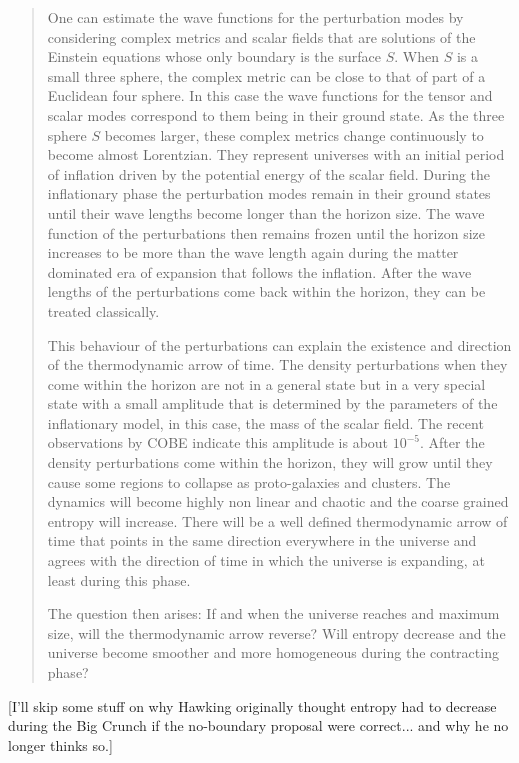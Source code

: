 \begin{quote}
One can estimate the wave functions for the perturbation modes by considering complex metrics and scalar fields that are solutions of the Einstein equations whose only boundary is the surface $S$. When $S$ is a small three sphere, the complex metric can be close to that of part of a Euclidean four sphere. In this case the wave functions for the tensor and scalar modes correspond to them being in their ground state. As the three sphere $S$ becomes larger, these complex metrics change continuously to become almost Lorentzian. They represent universes with an initial period of inflation driven by the potential energy of the scalar field. During the inflationary phase the perturbation modes remain in their ground states until their wave lengths become longer than the horizon size. The wave function of the perturbations then remains frozen until the horizon size increases to be more than the wave length again during the matter dominated era of expansion that follows the inflation. After the wave lengths of the perturbations come back within the horizon, they can be treated classically.

This behaviour of the perturbations can explain the existence and direction of the thermodynamic arrow of time. The density perturbations when they come within the horizon are not in a general state but in a very special state with a small amplitude that is determined by the parameters of the inflationary model, in this case, the mass of the scalar field. The recent observations by COBE indicate this amplitude is about $10^{-5}$. After the density perturbations come within the horizon, they will grow until they cause some regions to collapse as proto-galaxies and clusters. The dynamics will become highly non linear and chaotic and the coarse grained entropy will increase. There will be a well defined thermodynamic arrow of time that points in the same direction everywhere in the universe and agrees with the direction of time in which the universe is expanding, at least during this phase.

The question then arises: If and when the universe reaches and maximum size, will the thermodynamic arrow reverse? Will entropy decrease and the universe become smoother and more homogeneous during the contracting phase?
\end{quote}

[I'll skip some stuff on why Hawking originally thought entropy had to decrease during the Big Crunch if the no-boundary proposal were correct... and why he no longer thinks so.]


